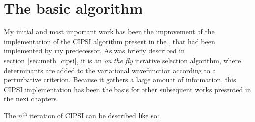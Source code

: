 \documentclass[./thesis.tex]{subfiles}
\begin{document}
\label{chap:CIPSI}


\section{The basic algorithm}
My initial and most important work has been the improvement of the implementation of the CIPSI algorithm present in the \QP, that had been implemented by my predecessor.\cite{giner:tel-01077016} As was briefly described in section~\ref{sec:meth_cipsi}, it is an \emph{on the fly} iterative selection algorithm, where determinants are added to the variational wavefunction according to a perturbative criterion. Because it gathers a large amount of information, this CIPSI implementation has been the basis for other subsequent works presented in the next chapters.

The $n^\text{th}$ iteration of CIPSI can be described like so:
\end{document}
